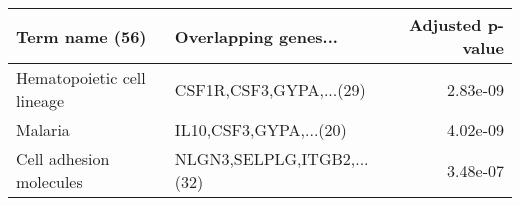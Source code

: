 \begin{tabular}{llr}
\toprule
            Term name (56) &       Overlapping genes... &  Adjusted p-value \\
\midrule
Hematopoietic cell lineage &    CSF1R,CSF3,GYPA,...(29) &          2.83e-09 \\
                   Malaria &     IL10,CSF3,GYPA,...(20) &          4.02e-09 \\
   Cell adhesion molecules & NLGN3,SELPLG,ITGB2,...(32) &          3.48e-07 \\
\bottomrule
\end{tabular}
